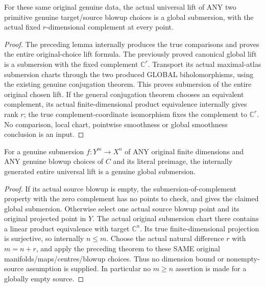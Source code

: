 \begin{theorem}
\label{hir:submersion-blowup-choice-global-smooth}
\leanok
{}
For these same original genuine data, the actual universal lift of ANY two
primitive genuine target/source blowup choices is a global submersion, with
the actual fixed $r$-dimensional complement at every point.
\end{theorem}
\begin{proof}
The preceding lemma internally produces the true comparisons and proves the
entire original-choice lift formula. The previously proved canonical global
lift is a submersion with the fixed complement $\mathbb C^r$. Transport its
actual maximal-atlas submersion charts through the two produced GLOBAL
biholomorphisms, using the existing genuine conjugation theorem. This proves
submersion of the entire original chosen lift. If the general conjugation
theorem chooses an equivalent complement, its actual finite-dimensional
product equivalence internally gives rank $r$; the true complement-coordinate
isomorphism fixes the complement to $\mathbb C^r$. No comparison, local chart,
pointwise smoothness or global smoothness conclusion is an input.
\end{proof}

\begin{theorem}
\label{hir:submersion-blowup-choice-arbitrary-dimensions}
\leanok
{}
For a genuine submersion $f:Y^m\to X^n$ of ANY original finite dimensions and
ANY genuine blowup choices of $C$ and its literal preimage, the internally
generated entire universal lift is a genuine global submersion.
\end{theorem}
\begin{proof}
If its actual source blowup is empty, the submersion-of-complement property
with the zero complement has no points to check, and gives the claimed
global submersion. Otherwise select one actual source blowup point and its
original projected point in $Y$. The actual original submersion chart there
contains a linear product equivalence with target $\mathbb C^n$. Its true
finite-dimensional projection is surjective, so internally $n\le m$.
Choose the actual natural difference $r$ with $m=n+r$, and apply the preceding
theorem to these SAME original manifolds/maps/centres/blowup choices.
Thus no dimension bound or nonempty-source assumption is supplied. In
particular no $m\ge n$ assertion is made for a globally empty source.
\end{proof}

